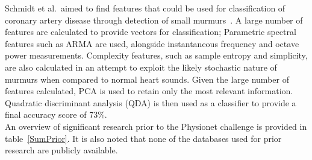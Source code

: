 \documentclass[titlepage, 12pt]{scrartcl} \usepackage{enumitem}
\begin{document}
Schmidt et al.\ aimed to find features that could be used for classification of
coronary artery disease through detection of small
murmurs~\parencite{Schmidt2015}. A large number of features are
calculated to provide vectors for classification; Parametric spectral features
such as ARMA are used, alongside instantaneous frequency and octave power
measurements. Complexity features, such as sample entropy and simplicity, are
also calculated in an attempt to exploit the likely stochastic nature of
murmurs when compared to normal heart sounds.  Given the large number of
features calculated, PCA is used to retain only the most relevant information.
Quadratic discriminant analysis (QDA) is then used as a classifier to provide a
final accuracy score of 73\%.\\

An overview of significant research prior to the Physionet challenge is
provided in table~\ref{SumPrior}. It is also noted that none of the databases
used for prior research are publicly available.
\end{document}
